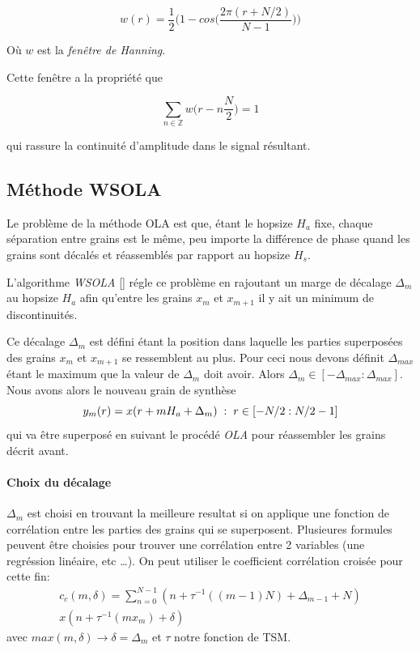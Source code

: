\documentclass[letterpaper]{article}
\begin{document}
$$ w(r) = \frac{1}{2} \bigg(1 - cos \bigg(\frac{2\pi(r + N/2)}{N-1}\bigg) \bigg) $$

Où $w$ est la \emph{fenêtre de Hanning}.

Cette fenêtre a la propriété que

$$ \sum_{n \in \mathbb{Z}} w \bigg( r - n \frac{N}{2} \bigg) = 1 $$

qui rassure la continuité d'amplitude dans le signal résultant. 

\subsection{Méthode WSOLA}

Le problème de la méthode OLA est que, étant le hopsize $H_a$ fixe, chaque séparation entre grains
est le même, peu importe la différence de phase quand les grains sont décalés et réassemblés par
rapport au hopsize $H_s$.

L'algorithme \emph{WSOLA} [\cite{WSOLA}] régle ce problème en rajoutant un marge de décalage
$\Delta_m$ au hopsize $H_a$ afin qu'entre les grains $x_m$ et $x_{m+1}$ il y ait un minimum de
discontinuités.

Ce décalage $\Delta_m$ est défini étant la position dans laquelle les parties superposées des grains
$x_m$ et $x_{m+1}$ se ressemblent au plus. Pour ceci nous devons définit $\Delta_{max}$ étant le
maximum que la valeur de $\Delta_m$ doit avoir. Alors $\Delta_m \in [-\Delta_{max} : \Delta_{max}]$.
Nous avons alors le nouveau grain de synthèse
$$ y_m(r) = x(r + mH_a + \Delta_m) \hspace{0.1cm} : \hspace{0.1cm} r \in [-N/2 : N/2 -1] $$
qui va être superposé en suivant le procédé \emph{OLA} pour réassembler les grains décrit avant.

\paragraph{Choix du décalage} $\Delta_m$ est choisi en trouvant la meilleure resultat si on applique
une fonction de corrélation entre les parties des grains qui se superposent. Plusieures formules
peuvent être choisies pour trouver une corrélation entre 2 variables (une regréssion linéaire, etc
\dots). On peut utiliser le coefficient corrélation croisée pour cette fin:
\begin{multline}
  c_c (m,\delta) = \sum^{N-1}_{n=0} (n + \tau^{-1} ((m-1)N) + \Delta_{m-1}+N) \\
  x(n + \tau^{-1}(mx_m)+\delta)
\end{multline}
avec $max(m,\delta) \rightarrow \delta=\Delta_m$ et $\tau$ notre fonction de TSM.
\end{document}

